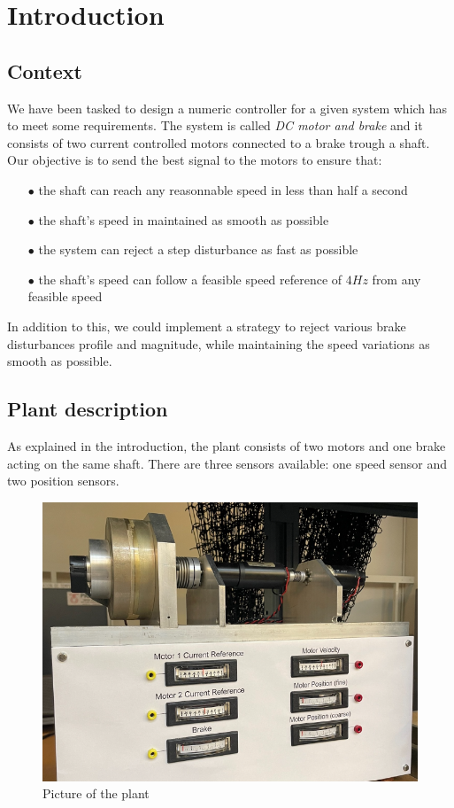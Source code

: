 \setcounter{secnumdepth}{-1}

\chapter{Introduction}

\section{Context}
\label{section:intro}

We have been tasked to design a numeric controller for a given system which has to meet some requirements. The system is 
called \textit{DC motor and brake} and it consists of two current controlled motors connected to a brake trough a shaft. \\

Our objective is to send the best signal to the motors to ensure that:

\begin{enumerate}
    \item[$\bullet$] the shaft can reach any reasonnable speed in less than half a second
    \item[$\bullet$] the shaft's speed in maintained as smooth as possible
    \item[$\bullet$] the system can reject a step disturbance as fast as possible
    \item[$\bullet$] the shaft's speed can follow a feasible speed reference of $4 Hz$ from any feasible speed
\end{enumerate}

In addition to this, we could implement a strategy to reject various brake disturbances profile and magnitude, while 
maintaining the speed variations as smooth as possible.

\section{Plant description}

As explained in the introduction, the plant consists of two motors and one brake acting on the same shaft. There are 
three sensors available: one speed sensor and two position sensors.

\begin{figure}[H]
    \centering
    \includegraphics[height=\textheight/5]{Pictures/plant_picture.png}
    \caption{Picture of the plant}
\end{figure}

